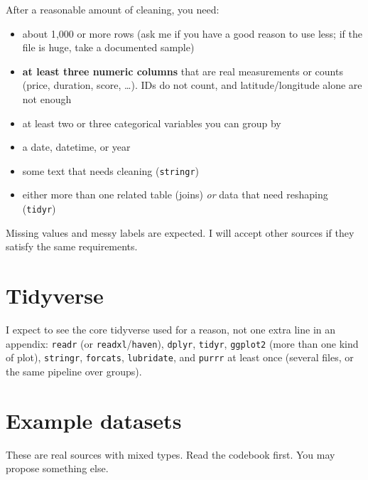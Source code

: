 \documentclass[11pt, a4paper]{article}
\begin{document}
After a reasonable amount of cleaning, you need:
\begin{itemize}
    \item about 1{,}000 or more rows (ask me if you have a good reason to use less; if the file is huge, take a documented sample)
    \item \textbf{at least three numeric columns} that are real measurements or counts (price, duration, score, \ldots). IDs do not count, and latitude/longitude alone are not enough
    \item at least two or three categorical variables you can group by
    \item a date, datetime, or year
    \item some text that needs cleaning (\texttt{stringr})
    \item either more than one related table (joins) \emph{or} data that need reshaping (\texttt{tidyr})
\end{itemize}
Missing values and messy labels are expected. I will accept other sources if they satisfy the same requirements.

\section*{Tidyverse}

I expect to see the core tidyverse used for a reason, not one extra line in an appendix: \texttt{readr} (or \texttt{readxl}/\texttt{haven}), \texttt{dplyr}, \texttt{tidyr}, \texttt{ggplot2} (more than one kind of plot), \texttt{stringr}, \texttt{forcats}, \texttt{lubridate}, and \texttt{purrr} at least once (several files, or the same pipeline over groups).

\section*{Example datasets}

These are real sources with mixed types. Read the codebook first. You may propose something else.
\end{document}
